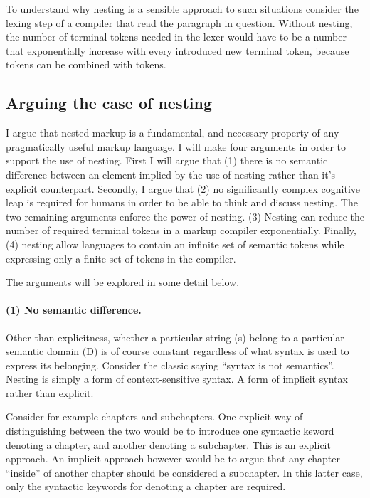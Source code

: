 \documentclass{scrreprt}
\begin{document}
To understand why nesting is a sensible approach to such situations consider the lexing step of a compiler that read the paragraph in question. Without nesting, the number of terminal tokens needed in the lexer would have to be a number that exponentially increase with every introduced new terminal token, because tokens can be combined with tokens.






\subsection{Arguing the case of nesting}
I argue that nested markup is a fundamental, and necessary property of any pragmatically useful markup language. I will make four arguments in order to support the use of nesting. First I will argue that (1) there is no semantic difference between an element implied by the use of nesting rather than it's explicit counterpart. Secondly, I argue that (2) no significantly complex cognitive leap is required for humans in order to be able to think and discuss nesting. The two remaining arguments enforce the power of nesting. (3) Nesting can reduce the number of required terminal tokens in a markup compiler exponentially. Finally, (4) nesting allow languages to contain an infinite set of semantic tokens while expressing only a finite set of tokens in the compiler.

The arguments will be explored in some detail below.



\paragraph{(1) No semantic difference.}
Other than explicitness, whether a particular string (s) belong to a particular semantic domain (D) is of course constant regardless of what syntax is used to express its belonging. Consider the classic saying ``syntax is not semantics''. Nesting is simply a form of context-sensitive syntax. A form of implicit syntax rather than explicit.

Consider for example chapters and subchapters. One explicit way of distinguishing between the two would be to introduce one syntactic keword denoting a chapter, and another denoting a subchapter. This is an explicit approach. An implicit approach however would be to argue that any chapter ``inside'' of another chapter should be considered a subchapter. In this latter case, only the syntactic keywords for denoting a chapter are required.
\end{document}
